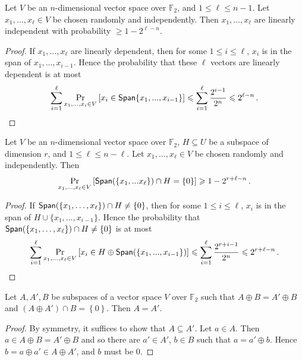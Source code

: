\documentclass{toc}
\newcommand\set[1]{{\left\{ #1 \right\}}}
\newcommand\Prob[2]{{\Pr_{#1}\left[ {#2} \right]}}
\newcommand\spnn[1]{{\sf Span}({#1})}
\newcommand*\xor{\mathbin{\oplus}}
\renewcommand\geq{\geqslant}
\renewcommand\leq{\leqslant}
\begin{document}
%
\begin{fact}\label{fact:aux_1}
Let $V$ be an $n$-dimensional vector space over $\mathbb{F}_2$,
and $1 \leq \ell \leq  n-1$. Let $x_1, \ldots, x_\ell \in V$ be chosen randomly and
independently. Then $x_1, \ldots, x_\ell$ are
linearly independent with probability $\geq 1-2^{\ell -n}$.
\end{fact}
\begin{proof} If $x_1, \ldots, x_\ell$ are linearly dependent, then for some
$1 \leq i \leq \ell$, $x_i$ is in the span of $x_1, \ldots, x_{i-1}$. Hence
the probability that these $\ell$ vectors are linearly dependent
%
is at most  %
%
\[   %
\sum\limits_{i=1}^{\ell}{\Prob{x_1,...,x_{i}\in V}
{x_i\in {\sf Span}{\set{x_1,...,x_{i-1}}}}} \leq
\sum\limits_{i=1}^{\ell}{\frac{2^{i-1}}{2^n}}\leq
2^{\ell-n}\,.     \qedhere
%
\]   %
\end{proof}

\begin{fact}\label{fact:aux_2}
Let $V$ be an $n$-dimensional vector space over $\mathbb{F}_2$,
$H\subseteq U$ be a subspace of dimension $r$, and $1 \leq \ell \leq  n-\ell$.
Let $x_1, \ldots, x_\ell \in V$ be chosen randomly and independently. Then
\[
\Prob{x_1,...,x_\ell \in V }{\spnn{\set{x_1,...x_\ell}}\cap H =\set{0}}\geq 1-2^{r+\ell-n}\,.%
\]
\end{fact}
\begin{proof} If ${\sf Span}(\{ x_1, \ldots, x_\ell\}) \cap H \neq  \{0\}$, then for some $1 \leq i \leq \ell$, $x_i$ is in the span of $H \cup \{x_1, \ldots, x_{i-1}\}$. Hence
the probability that ${\sf Span}(\{ x_1, \ldots, x_\ell\}) \cap H \neq  \{0\}$
%
is at most  %
%
\[     %
\sum\limits_{i=1}^{\ell}{\Prob{x_1,...,x_\ell \in V}
{{x_i\in H\xor\spnn{\set{x_1,...,x_{i-1}}}}}}
\leqslant\sum\limits_{i=1}^{\ell}{\frac{2^{r+i-1}}{2^{n}}}
\leqslant 2^{r+\ell-n}\,.   \qedhere
%
\]         %
\end{proof}

\begin{fact}\label{fact:aux_3}  %
%
Let  $A,A',B$ be subspaces of a vector space $V$ over ${\mathbb F}_2$ such that
$A\xor B = A'\xor B$ and $(A\xor A')\cap B = \set{0}$. Then $A=A'$.
\end{fact}
\begin{proof}
By symmetry, it suffices to show that $A\subseteq A'$. Let $a\in A$. Then
$a\in A\xor B = A'\xor B$ and so there are $a'\in A'$, $b\in B$ such
that $a = a' \xor b$. Hence $b=a\xor a'\in A\xor A'$, and $b$ must be $0$.
\end{proof}
\end{document}
